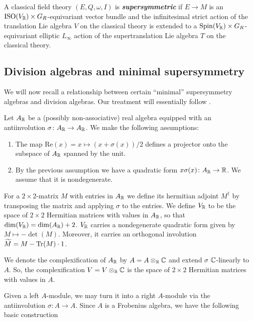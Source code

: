 \documentclass[10pt, oneside]{article}
\renewcommand{\Re}{\mathrm{Re}}
\newcommand{\defterm}[1]{\textbf{\emph{#1}}}
\begin{document}
\begin{definition}
\label{dfn: super}
A classical field theory $(E, Q, \omega, I)$ is \defterm{supersymmetric} if $E\rightarrow M$ is an $\mathrm{ISO}(V_\mathbb R)\times G_R$-equivariant vector bundle and the infinitesimal strict action of the translation Lie algebra $V$ on the classical theory is extended to a $\mathrm{Spin}(V_\mathbb R)\times G_R$-equivariant elliptic $L_\infty$ action of the supertranslation Lie algebra $T$ on the classical theory.
\end{definition}

\subsection{Division algebras and minimal supersymmetry}
\label{sect:divisionalgebras}

We will now recall a relationship between certain ``minimal'' supersymmetry algebras and division algebras. Our treatment will essentially follow \cite{BaezHuerta}.

Let $A_\mathbb R$ be a (possibly non-associative) real algebra equipped with an antiinvolution $\sigma\colon A_\mathbb R\rightarrow A_\mathbb R$. We make the following assumptions:
\begin{enumerate}
\item The map $\Re(x)=x\mapsto (x + \sigma(x))/2$ defines a projector onto the subspace of $A_\mathbb R$ spanned by the unit.

\item By the previous assumption we have a quadratic form $x\sigma(x)\colon A_\mathbb R\rightarrow \mathbb R$. We assume that it is nondegenerate.
\end{enumerate}

For a $2\times 2$-matrix $M$ with entries in $A_\mathbb R$ we define its hermitian adjoint $M^\dagger$ by transposing the matrix and applying $\sigma$ to the entries. We define $V_\mathbb R$ to be the space of $2\times 2$ Hermitian matrices with values in $A_\mathbb R$, so that $\dim(V_\mathbb R) = \dim(A_\mathbb R) + 2$. $V_\mathbb R$ carries a nondegenerate quadratic form given by $M\mapsto -\det(M)$. Moreover, it carries an orthogonal involution $\widetilde{M} = M - \operatorname{Tr}(M)\cdot 1$.

We denote the complexification of $A_\mathbb R$ by $A=A\otimes_\mathbb R \mathbb C$ and extend $\sigma$ $\mathbb C$-linearly to $A$. So, the complexification $V=V\otimes_\mathbb R\mathbb C$ is the space of $2\times 2$ Hermitian matrices with values in $A$.

Given a left $A$-module, we may turn it into a right $A$-module via the antiinvolution $\sigma\colon A\rightarrow A$. Since $A$ is a Frobenius algebra, we have the following basic construction 
\end{document}
